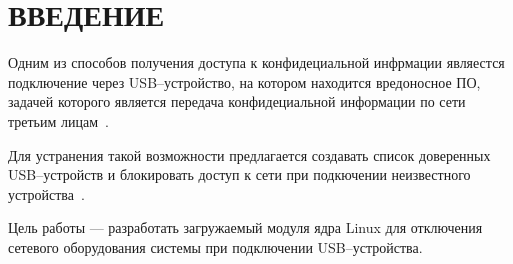 \chapter*{ВВЕДЕНИЕ}

Одним из способов получения доступа к конфидециальной инфрмации являестся подключение через USB--устройство, на котором находится вредоносное ПО, задачей которого является передача конфидециальной информации по сети третьим лицам~\cite{usbmalware}.

Для устранения такой возможности предлагается создавать список доверенных USB--устройств и блокировать доступ к сети при подкючении неизвестного устройства~\cite{usbdrop}.

Цель работы --- разработать загружаемый модуля ядра Linux для отключения сетевого оборудования системы при подключении USB--устройства.